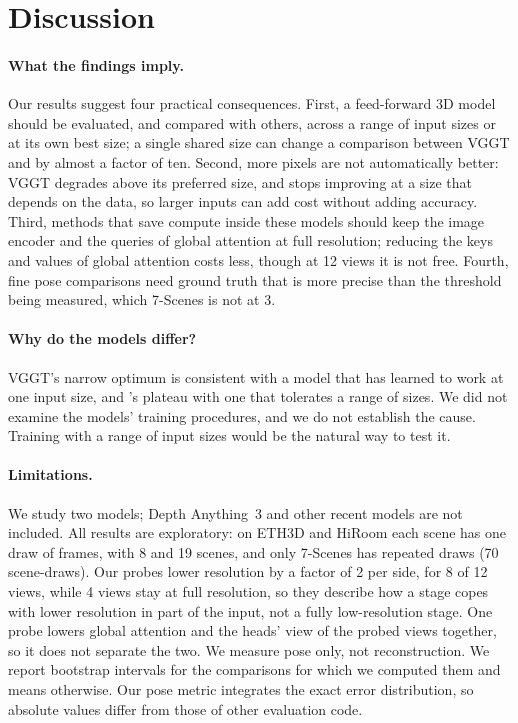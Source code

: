 \section{Discussion}
\label{sec:discussion}

\paragraph{What the findings imply.}
Our results suggest four practical consequences. First, a feed-forward 3D model should be evaluated, and compared with others, across a range of input sizes or at its own best size; a single shared size can change a comparison between VGGT and \pithree by almost a factor of ten. Second, more pixels are not automatically better: VGGT degrades above its preferred size, and \pithree stops improving at a size that depends on the data, so larger inputs can add cost without adding accuracy. Third, methods that save compute inside these models should keep the image encoder and the queries of global attention at full resolution; reducing the keys and values of global attention costs less, though at 12 views it is not free. Fourth, fine pose comparisons need ground truth that is more precise than the threshold being measured, which 7-Scenes is not at 3\textdegree.

\paragraph{Why do the models differ?}
VGGT's narrow optimum is consistent with a model that has learned to work at one input size, and \pithree's plateau with one that tolerates a range of sizes. We did not examine the models' training procedures, and we do not establish the cause. Training with a range of input sizes would be the natural way to test it.

\paragraph{Limitations.}
We study two models; Depth Anything~3 and other recent models are not included. All results are exploratory: on ETH3D and HiRoom each scene has one draw of frames, with 8 and 19 scenes, and only 7-Scenes has repeated draws (70 scene-draws). Our probes lower resolution by a factor of 2 per side, for 8 of 12 views, while 4 views stay at full resolution, so they describe how a stage copes with lower resolution in part of the input, not a fully low-resolution stage. One probe lowers global attention and the heads' view of the probed views together, so it does not separate the two. We measure pose only, not reconstruction. We report bootstrap intervals for the comparisons for which we computed them and means otherwise. Our pose metric integrates the exact error distribution, so absolute values differ from those of other evaluation code.

